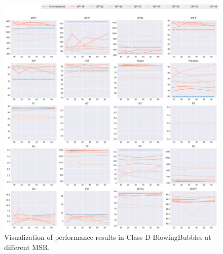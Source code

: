 \begin{figure}[!htbp]
\centering
\includegraphics[width=1.0\linewidth]{img/appendix/BlowingBubbles_all_multiplots_msr.pdf}
\caption[Visualization of performance results in Class D BlowingBubbles at different MSR]
{Visualization of performance results in Class D BlowingBubbles at different MSR.}
\label{fig:BlowingBubbles_all_msr}
\end{figure}



